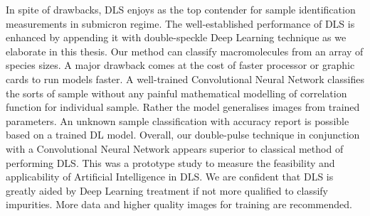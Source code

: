 In spite of drawbacks, DLS enjoys as the top contender for sample identification measurements in submicron regime. The well-established performance of DLS is enhanced by appending it with double-speckle Deep Learning technique as we elaborate in this thesis. Our method can classify macromolecules from an array of species sizes. A major drawback comes at the cost of faster processor or graphic cards to run models faster. A well-trained Convolutional Neural Network classifies the sorts of sample without any painful mathematical modelling of correlation function for individual sample. Rather the model generalises images from trained parameters. An unknown sample classification with accuracy report is possible based on a trained DL model. Overall, our double-pulse technique in conjunction with a Convolutional Neural Network appears superior to classical method of performing DLS. This was a prototype study to measure the feasibility and applicability of Artificial Intelligence in DLS. We are confident that DLS is greatly aided by Deep Learning treatment if not more qualified to classify impurities. More data and higher quality images for training are recommended. 